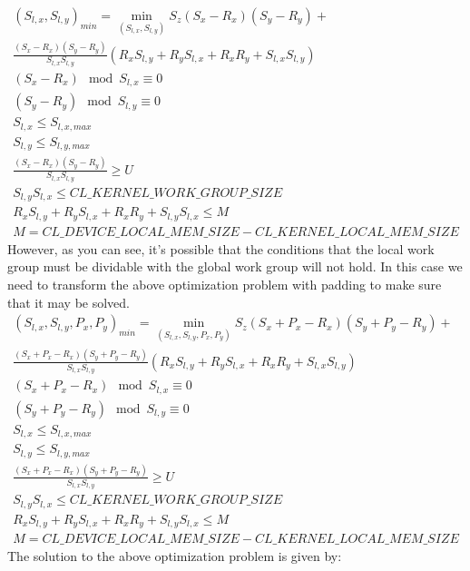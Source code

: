 \documentclass[a4paper,10pt]{article}
\theoremstyle{definition}
\begin{document}
\begin{gather*}
(S_{l,x}, S_{l,y})_{min} = \min_{(S_{l,x}, S_{l,y})} S_z(S_x - R_x)(S_y - R_y) + \\
 \frac{(S_x - R_x)(S_y - R_y)}{S_{l,x}S_{l,y}} ( R_xS_{l,y} + R_yS_{l,x} + R_xR_y + S_{l,x}S_{l,y}) \\
(S_x - R_x) \mod{S_{l,x}} \equiv 0 \\
(S_y - R_y) \mod{S_{l,y}} \equiv 0 \\
S_{l,x} \leq S_{l,x, max} \\
S_{l,y} \leq S_{l,y, max} \\
 \frac{(S_x - R_x)(S_y - R_y)}{S_{l,x}S_{l,y}} \geq U \\
S_{l,y}S_{l,x} \leq CL\_KERNEL\_WORK\_GROUP\_SIZE \\
R_x S_{l,y} + R_y S_{l,x} + R_xR_y + S_{l,y}S_{l,x} \leq M \\
M = CL\_DEVICE\_LOCAL\_MEM\_SIZE - CL\_KERNEL\_LOCAL\_MEM\_SIZE
\end{gather*}
However, as you can see, it's possible that the conditions that the local work group must be dividable with the global work group will not hold. In this case we need to transform the above optimization problem with padding to make sure that it may be solved.
\begin{gather*}
(S_{l,x}, S_{l,y}, P_x, P_y)_{min} = \min_{(S_{l,x}, S_{l,y}, P_x, P_y)} S_z(S_x + P_x - R_x)(S_y + P_y - R_y) + \\
\frac{(S_x + P_x - R_x)(S_y + P_y - R_y)}{S_{l,x}S_{l,y}} ( R_xS_{l,y} + R_yS_{l,x} + R_xR_y + S_{l,x}S_{l,y}) \\
(S_x + P_x - R_x) \mod{S_{l,x}} \equiv 0 \\
(S_y  + P_y - R_y) \mod{S_{l,y}} \equiv 0 \\
S_{l,x} \leq S_{l,x, max} \\
S_{l,y} \leq S_{l,y, max} \\
\frac{(S_x + P_x - R_x)(S_y + P_y - R_y)}{S_{l,x}S_{l,y}} \geq U \\
S_{l,y}S_{l,x} \leq CL\_KERNEL\_WORK\_GROUP\_SIZE \\
R_x S_{l,y} + R_y S_{l,x} + R_xR_y + S_{l,y}S_{l,x} \leq M \\
M = CL\_DEVICE\_LOCAL\_MEM\_SIZE - CL\_KERNEL\_LOCAL\_MEM\_SIZE
\end{gather*}
The solution to the above optimization problem is given by: \\
\end{document}
